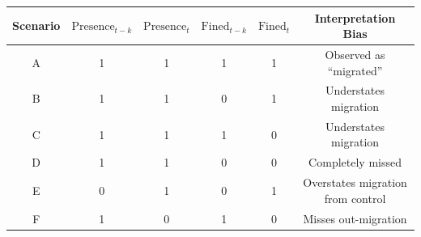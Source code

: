 \documentclass[12pt]{article}
\begin{document}
\begin{center}
\begin{tabular}{cccccc}
\toprule
Scenario & $\text{Presence}_{t-k}$ & $\text{Presence}_t$ & $\text{Fined}_{t-k}$ & $\text{Fined}_t$ & Interpretation Bias \\
\midrule
A & 1 & 1 & 1 & 1 & Observed as ``migrated'' \\
B & 1 & 1 & 0 & 1 & Understates migration \\
C & 1 & 1 & 1 & 0 & Understates migration \\
D & 1 & 1 & 0 & 0 & Completely missed \\
E & 0 & 1 & 0 & 1 & Overstates migration from control \\
F & 1 & 0 & 1 & 0 & Misses out-migration \\
\bottomrule
\end{tabular}
\end{center}
\end{document}

